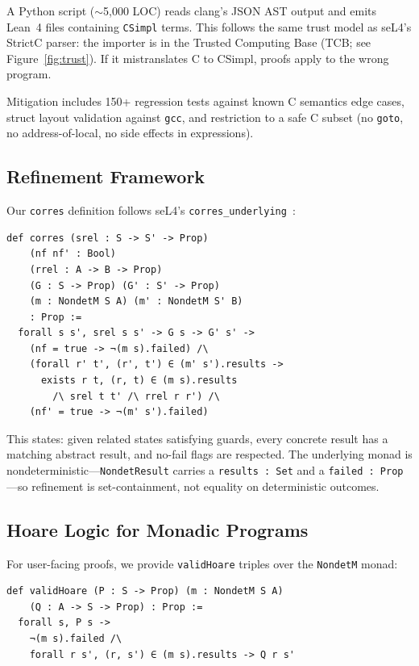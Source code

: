 \documentclass[sigconf,nonacm,screen]{acmart}
\begin{document}
A Python script ($\sim$5,000 LOC) reads clang's JSON AST
output and emits Lean~4 files containing \texttt{CSimpl} terms. This follows the same trust model as seL4's
StrictC parser: the importer is in the Trusted Computing Base
(TCB; see Figure~\ref{fig:trust}). If
it mistranslates C to CSimpl, proofs apply to the wrong program.

Mitigation includes 150+ regression tests against known C semantics
edge cases, struct layout validation against \texttt{gcc}, and
restriction to a safe C subset (no \texttt{goto}, no address-of-local,
no side effects in expressions).

\subsection{Refinement Framework}

Our \texttt{corres} definition follows seL4's
\texttt{corres\_underlying}~\cite{sewell2013translation}:

\begin{lstlisting}[language=Lean]
def corres (srel : S -> S' -> Prop)
    (nf nf' : Bool)
    (rrel : A -> B -> Prop)
    (G : S -> Prop) (G' : S' -> Prop)
    (m : NondetM S A) (m' : NondetM S' B)
    : Prop :=
  forall s s', srel s s' -> G s -> G' s' ->
    (nf = true -> ¬(m s).failed) /\
    (forall r' t', (r', t') ∈ (m' s').results ->
      exists r t, (r, t) ∈ (m s).results
        /\ srel t t' /\ rrel r r') /\
    (nf' = true -> ¬(m' s').failed)
\end{lstlisting}

This states: given related states satisfying guards,
every concrete result has a matching abstract result, and no-fail
flags are respected. The underlying monad is nondeterministic---\texttt{NondetResult}
carries a \texttt{results : Set} and a \texttt{failed : Prop}---so
refinement is set-containment, not equality on deterministic outcomes.

\subsection{Hoare Logic for Monadic Programs}

For user-facing proofs, we provide \texttt{validHoare}
triples over the \texttt{NondetM} monad:

\begin{lstlisting}[language=Lean]
def validHoare (P : S -> Prop) (m : NondetM S A)
    (Q : A -> S -> Prop) : Prop :=
  forall s, P s ->
    ¬(m s).failed /\
    forall r s', (r, s') ∈ (m s).results -> Q r s'
\end{lstlisting}
\end{document}
